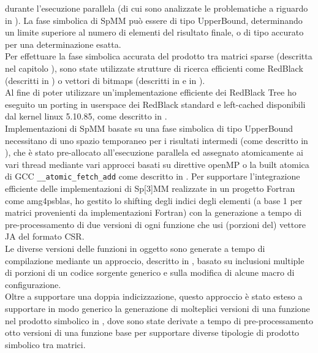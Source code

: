 durante l'esecuzione parallela (di cui sono analizzate le problematiche a riguardo in ).
La fase simbolica di SpMM può essere di tipo UpperBound, determinando un limite superiore al numero di elementi \nnz del risultato finale,
o di tipo accurato per una determinazione esatta.\\
Per effettuare la fase simbolica accurata del prodotto tra matrici sparse (descritta nel capitolo ),
sono state utilizzate strutture di ricerca efficienti come RedBlack (descritti in )
o vettori di bitmaps (descritti in  e in  ).\\
Al fine di poter utilizzare un'implementazione efficiente dei RedBlack Tree ho eseguito un porting in userspace
dei RedBlack standard e left-cached disponibili dal kernel linux 5.10.85, come descritto in .\\
Implementazioni di SpMM basate su una fase simbolica di tipo UpperBound necessitano di uno spazio temporaneo per i risultati intermedi
(come descritto in  ), che è stato pre-allocato all'esecuzione parallela ed 
assegnato atomicamente ai vari thread mediante vari approcci basati su direttive openMP o la built atomica di GCC
\verb|__atomic_fetch_add| come descritto in .
\voidLine
Per supportare l'integrazione efficiente delle implementazioni di Sp[3]MM realizzate in un progetto Fortran come 
amg4psblas, ho gestito lo shifting degli indici degli elementi \nnz (a base 1 per matrici provenienti da implementazioni Fortran)
con la generazione a tempo di pre-processamento di due versioni di ogni 
funzione che usi (porzioni del) vettore JA del formato CSR.\\
Le diverse versioni delle funzioni in oggetto sono generate a tempo di compilazione
mediante un approccio, descritto in , basato su 
inclusioni multiple di porzioni di un codice sorgente generico e sulla modifica di alcune macro di configurazione.\\
Oltre a supportare una doppia indicizzazione, questo approccio è stato esteso a 
supportare in modo generico la generazione di molteplici versioni di una funzione nel prodotto simbolico in , 
dove sono state derivate a tempo di pre-processamento otto versioni di una funzione base  per 
supportare diverse tipologie di prodotto simbolico tra matrici.

